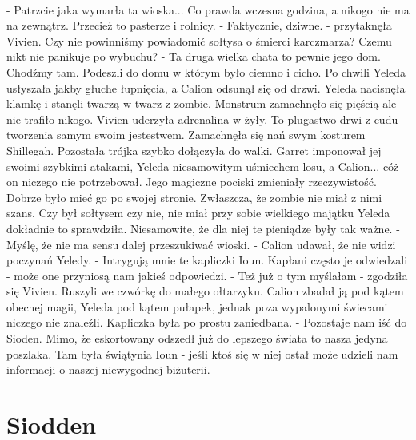 \documentclass[10pt,twoside,twocolumn]{book}
\begin{document}
\paragraph{}
- Patrzcie jaka wymarła ta wioska... Co prawda wczesna godzina, a nikogo nie ma na zewnątrz. Przecież to pasterze i rolnicy.\newline
\indent - Faktycznie, dziwne. - przytaknęła Vivien. Czy nie powinniśmy powiadomić sołtysa o śmierci karczmarza? Czemu nikt nie panikuje po wybuchu?\newline
\indent - Ta druga wielka chata to pewnie jego dom. Chodźmy tam.\newline
Podeszli do domu w którym było ciemno i cicho. 
Po chwili Yeleda usłyszała jakby głuche łupnięcia, a Calion odsunął się od drzwi. 
Yeleda nacisnęła klamkę i stanęli twarzą w twarz z zombie. 
Monstrum zamachnęło się pięścią ale nie trafiło nikogo. 
Vivien uderzyła adrenalina w żyły. 
To plugastwo drwi z cudu tworzenia samym swoim jestestwem. 
Zamachnęła się nań swym kosturem Shillegah. 
Pozostała trójka szybko dołączyła do walki. 
Garret imponował jej swoimi szybkimi atakami, Yeleda niesamowitym uśmiechem losu, a Calion... cóż on niczego nie potrzebował. 
Jego magiczne pociski zmieniały rzeczywistość. 
Dobrze było mieć go po swojej stronie. 
Zwłaszcza, że zombie nie miał z nimi szans. 
Czy był sołtysem czy nie, nie miał przy sobie wielkiego majątku Yeleda dokładnie to sprawdziła. 
Niesamowite, że dla niej te pieniądze były tak ważne.\newline
\indent - Myślę, że nie ma sensu dalej przeszukiwać wioski. - Calion udawał, że nie widzi poczynań Yeledy. - Intrygują mnie te kapliczki Ioun. Kapłani często je odwiedzali - może one przyniosą nam jakieś odpowiedzi.\newline
\indent - Też już o tym myślałam - zgodziła się Vivien. \newline 
Ruszyli we czwórkę do małego ołtarzyku. Calion zbadał ją pod kątem obecnej magii, Yeleda pod kątem pułapek, jednak poza wypalonymi świecami niczego nie znaleźli. Kapliczka była po prostu zaniedbana.\newline
\indent - Pozostaje nam iść do Sioden. Mimo, że eskortowany odszedł już do lepszego świata to nasza jedyna poszlaka. Tam była świątynia Ioun - jeśli ktoś się w niej ostał może udzieli nam informacji o naszej niewygodnej biżuterii.\newline

\section*{Siodden}
\end{document}
